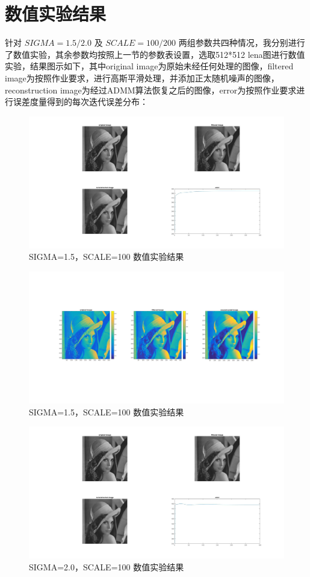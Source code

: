 \documentclass[a4paper, UTF8]{ctexrep}
\begin{document}
			\section{数值实验结果}
				针对 $SIGMA = 1.5/2.0$ 及 $SCALE = 100/200$ 两组参数共四种情况，我分别进行了数值实验，其余参数均按照上一节的参数表设置，选取512*512 lena图进行数值实验，结果图示如下，其中original image为原始未经任何处理的图像，filtered image为按照作业要求，进行高斯平滑处理，并添加正太随机噪声的图像，reconstruction image为经过ADMM算法恢复之后的图像，error为按照作业要求进行误差度量得到的每次迭代误差分布：
				\begin{figure}[htbp!]
					\includegraphics[width = 1 \textwidth]{fig2.jpg}
					\caption{SIGMA=1.5，SCALE=100 数值实验结果}
				\end{figure}
				\begin{figure}[htbp!]
					\includegraphics[width = 1 \textwidth]{fig3.jpg}
					\caption{SIGMA=1.5，SCALE=100 数值实验结果}
				\end{figure}
				\begin{figure}[htbp!]
					\includegraphics[width = 1 \textwidth]{fig4.jpg}
					\caption{SIGMA=2.0，SCALE=100 数值实验结果}
				\end{figure}
\end{document}
